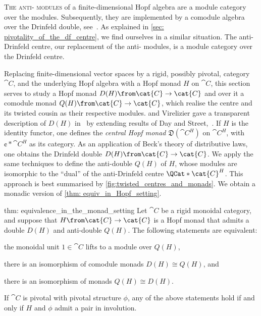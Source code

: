 \textsc{The anti\hyp{}\YetterDrinfeld{} modules}
of a finite\hyp{}dimensional Hopf algebra
are a module category
over the \YetterDrinfeld{} modules.
Subsequently, they are implemented by a comodule algebra over the Drinfeld double,
see~\cite{Hajac2004a}.
As explained in \cref{sec: pivotality_of_the_df_centre},
we find ourselves in a similar situation.
The anti\hyp{}Drinfeld centre,
our replacement of the anti\hyp{}\YetterDrinfeld{} modules,
is a module category over the Drinfeld centre.

Replacing finite\hyp{}dimensional vector spaces by
a rigid, possibly pivotal, category \(\cat{C}\),
and the underlying Hopf algebra with a Hopf monad \(H\) on \(\cat{C}\),
this section serves to study a Hopf monad \(D(H) \from \cat{C} \to \cat{C}\)
and over it a comodule monad \(Q(H)\from \cat{C} \to \cat{C}\),
which realise the centre and its twisted cousin as their respective modules.
\Bruguieres{} and Virelizier gave a transparent description of \(D(H)\) in~\cite{Bruguieres2012}
by extending results of Day and Street,~\cite{Day2007}.
If \(H\) is the identity functor,
one defines the \emph{central Hopf monad} \(\mathfrak{D}(\cat{C}^H)\) on \(\cat{C}^H\),
with \(\cent*{\cat{C}^H}\) as its \EilenbergMoore{} category.
As an application of Beck's theory of distributive laws,
one obtains the Drinfeld double \(D(H) \from \cat{C} \to \cat{C}\).
We apply the same techniques to define the anti\hyp{}double \(Q(H)\) of \(H\),
whose modules are isomorphic to the ``dual'' of the anti\hyp{}Drinfeld centre \(\QCat*{\cat{C}^H}\).
This approach is best summarised by \cref{fig:twisted_centres_and_monads}.
We obtain a monadic version of \cref{thm: equiv_in_Hopf_setting}.
\begin{reptheorem}{thm: equivalence_in_the_monad_setting}
  Let \(\cat{C}\) be a rigid monoidal category,
  and suppose that \(H \from \cat{C} \to \cat{C}\) is a Hopf monad
  that admits a double \(D(H)\) and anti\hyp{}double \(Q(H)\).
  The following statements are equivalent:
  \begin{thmlist}[noitemsep]
    \item the monoidal unit \(1 \in \cat{C}\) lifts to a module over \(Q(H)\),
    \item there is an isomorphism of comodule monads \(D(H) \cong Q(H)\), and
    \item there is an isomorphism of monads \(Q(H) \cong D(H)\).
  \end{thmlist}
  If \(\cat{C}\) is pivotal with pivotal structure \(\phi\),
  any of the above statements hold if and only if \(H\) and \(\phi\) admit a pair in involution.
\end{reptheorem}
